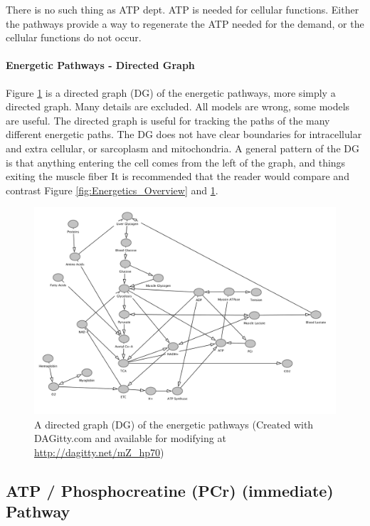 There is no such thing as ATP dept. ATP is needed for cellular functions. Either the pathways provide a way to regenerate the ATP needed for the demand, or the cellular functions do not occur.

\paragraph{Energetic Pathways - Directed Graph}

Figure \ref{fig:energetic_paths} is a directed graph (DG) of the energetic pathways, more simply a directed graph. Many details are excluded. All models are wrong, some models are useful. The directed graph is useful for tracking the paths of the many different energetic paths. The DG does not have clear boundaries for intracellular and extra cellular, or sarcoplasm and mitochondria. A general pattern of the DG is that anything entering the cell comes from the left of the graph, and things exiting the muscle fiber  It is recommended that the reader would compare and contrast Figure \ref{fig:Energetics_Overview} and \ref{fig:energetic_paths}. 

\begin{figure}[!h]
    \centering
    \includegraphics[width=1\linewidth]{./figure/energetic_paths.png}
    \caption{A directed graph (DG) of the energetic pathways (\footnotesize{Created with DAGitty.com and available for modifying at \url{http://dagitty.net/mZ_hp70}})}
    \label{fig:energetic_paths}
\end{figure}



\subsection{ATP / Phosphocreatine (PCr) (immediate) Pathway}


